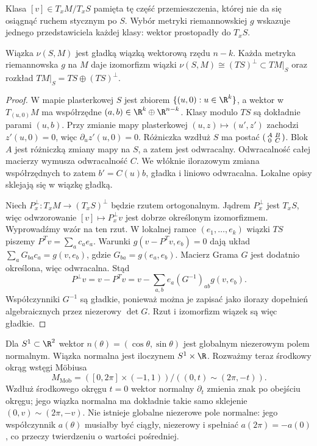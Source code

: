 Klasa $[v]\in T_xM/T_xS$ pamięta tę część
przemieszczenia, której nie da się osiągnąć
ruchem stycznym po $S$. Wybór metryki
riemannowskiej $g$ wskazuje jednego
przedstawiciela każdej klasy: wektor
prostopadły do $T_xS$.

\begin{stwierdzenie}
\label{prop:normalna-rozszczepienie}
Wiązka $\nu(S,M)$ jest gładką wiązką
wektorową rzędu $n-k$. Każda metryka
riemannowska $g$ na $M$ daje izomorfizm
wiązki $\nu(S,M)\cong(TS)^\perp\subset TM|_S$
oraz rozkład $TM|_S=TS\oplus(TS)^\perp$.
\end{stwierdzenie}
\begin{proof}
W mapie plasterkowej $S$ jest zbiorem
$\{(u,0):u\in\R^k\}$, a wektor w $T_{(u,0)}M$
ma współrzędne $(a,b)\in\R^k\oplus\R^{n-k}$.
Klasy modulo $TS$ są dokładnie parami $(u,b)$.
Przy zmianie mapy plasterkowej $(u,z)\mapsto(u',z')$
zachodzi $z'(u,0)=0$, więc $\partial_u z'(u,0)=0$.
Różniczka wzdłuż $S$ ma postać
$\begin{psmallmatrix}A&B\\0&C\end{psmallmatrix}$.
Blok $A$ jest różniczką zmiany mapy na $S$, a zatem jest
odwracalny. Odwracalność całej macierzy wymusza
odwracalność $C$.
We włóknie ilorazowym zmiana współrzędnych to zatem
$b'=C(u)b$, gładka i liniowo odwracalna.
Lokalne opisy sklejają się w wiązkę gładką.

Niech $P^\perp_x:T_xM\to(T_xS)^\perp$
będzie rzutem ortogonalnym.
Jądrem $P^\perp_x$ jest $T_xS$, więc
odwzorowanie $[v]\mapsto P^\perp_xv$ jest
dobrze określonym izomorfizmem.
Wyprowadźmy wzór na ten rzut.
W lokalnej ramce $(e_1,\ldots,e_k)$ wiązki $TS$ piszemy
$P^Tv=\sum_a c_ae_a$.
Warunki $g(v-P^Tv,e_b)=0$ dają układ
$\sum_aG_{ba}c_a=g(v,e_b)$, gdzie $G_{ba}=g(e_a,e_b)$.
Macierz Grama $G$ jest dodatnio określona, więc odwracalna.
Stąd
\[
 P^\perp v=v-P^Tv
 =v-\sum_{a,b}e_a(G^{-1})_{ab}g(v,e_b).
\]
Współczynniki $G^{-1}$ są gładkie, ponieważ można je
zapisać jako ilorazy dopełnień algebraicznych przez
niezerowy $\det G$. Rzut i izomorfizm wiązek są więc gładkie.
\end{proof}

\begin{przyklad}
\label{prz:normalna-mobius}
Dla $S^1\subset\R^2$ wektor
$n(\theta)=(\cos\theta,\sin\theta)$
jest globalnym niezerowym polem normalnym.
Wiązka normalna jest iloczynem
$S^1\times\R$.
Rozważmy teraz środkowy okrąg wstęgi
Möbiusa
\[
 M_{\mathrm{Mob}}
 =([0,2\pi]\times(-1,1))/
            ((0,t)\sim(2\pi,-t)).
\]
Wzdłuż środkowego okręgu $t=0$
wektor normalny $\partial_t$ zmienia
znak po obejściu okręgu; jego wiązka
normalna ma dokładnie takie samo
sklejenie $(0,v)\sim(2\pi,-v)$.
Nie istnieje globalne niezerowe
pole normalne: jego współczynnik
$a(\theta)$ musiałby być ciągły,
niezerowy i spełniać
$a(2\pi)=-a(0)$, co przeczy
twierdzeniu o wartości pośredniej.
\end{przyklad}

